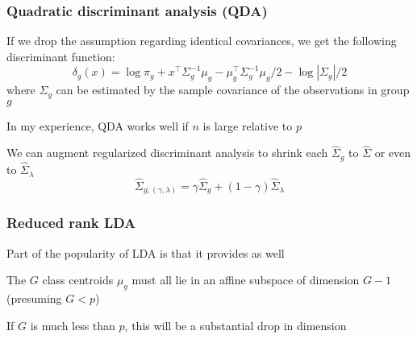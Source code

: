 \documentclass[12pt]{beamer}
\begin{document}
\begin{frame}
\frametitle{Quadratic discriminant analysis (QDA)}
If we drop the assumption regarding identical covariances, we get the following discriminant function:
\[
\delta_g(x) = \log \pi_g + x^{\top} \Sigma_g^{-1}\mu_g  - \mu_{g}^{\top} \Sigma_g^{-1} \mu_g /2 - \log | \Sigma_g|/2
\]
where $\Sigma_g$ can be estimated by the sample covariance of the observations in group $g$
\vsp

In my experience, QDA works well if $n$ is large relative to $p$

\vsp

We can augment regularized discriminant analysis to shrink each $\hat{\Sigma}_g$ to $\hat{\Sigma}$ or even to 
$\hat{\Sigma}_\lambda$
\[
\hat{\Sigma}_{g,(\gamma,\lambda)}  = \gamma\hat{\Sigma}_g + (1-\gamma)\hat{\Sigma}_{\lambda}
\]
\end{frame}


\begin{frame}
\frametitle{Reduced rank LDA}
Part of the popularity of LDA is that it provides  as well

\vsp
The $G$ class centroids $\mu_g$ must all lie in an affine subspace of dimension $G-1$ (presuming
$G < p$)


\vsp
If $G$ is much less than $p$, this will be a substantial drop in dimension
\end{frame}
\end{document}
